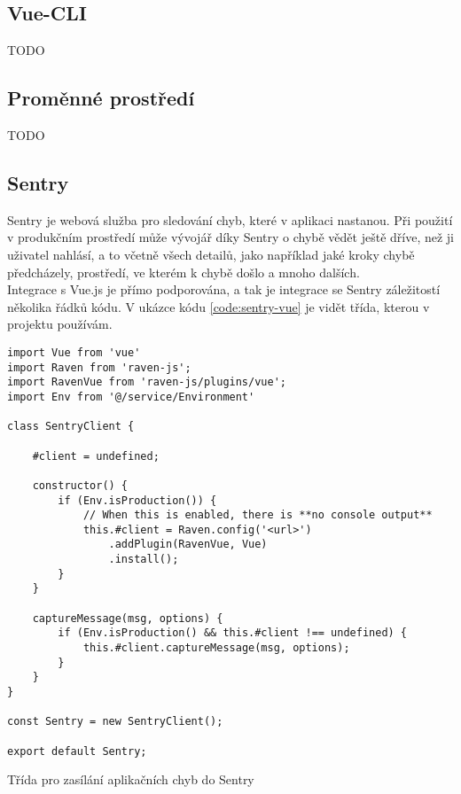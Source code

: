 
\subsection{Vue-CLI}

TODO


\subsection{Proměnné prostředí}

TODO


\subsection{Sentry}

Sentry \cite{sentry} je webová služba pro sledování chyb, které v aplikaci nastanou. Při použití v produkčním prostředí může vývojář díky Sentry o chybě vědět ještě dříve, než ji uživatel nahlásí, a to včetně všech detailů, jako například jaké kroky chybě předcházely, prostředí, ve kterém k chybě došlo a mnoho dalších.\\
Integrace s Vue.js je přímo podporována, a tak je integrace se Sentry záležitostí několika řádků kódu. V ukázce kódu \ref{code:sentry-vue} je vidět třída, kterou v projektu používám.

\begin{listing}[H]
\begin{verbatim}
import Vue from 'vue'
import Raven from 'raven-js';
import RavenVue from 'raven-js/plugins/vue';
import Env from '@/service/Environment'

class SentryClient {

    #client = undefined;

    constructor() {
        if (Env.isProduction()) {
            // When this is enabled, there is **no console output**
            this.#client = Raven.config('<url>')
                .addPlugin(RavenVue, Vue)
                .install();
        }
    }

    captureMessage(msg, options) {
        if (Env.isProduction() && this.#client !== undefined) {
            this.#client.captureMessage(msg, options);
        }
    }
}

const Sentry = new SentryClient();

export default Sentry;
\end{verbatim}
\caption{Třída pro zasílání aplikačních chyb do Sentry} \label{code:sentry-vue}
\end{listing}

